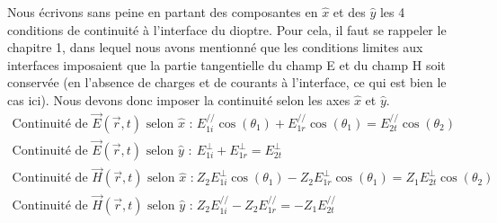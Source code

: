 Nous écrivons sans peine en partant des composantes en $\hat{x}$ et des $\hat{y}$ les 4 conditions de continuité à l'interface du dioptre. Pour cela, il faut se rappeler le chapitre 1, dans lequel nous avons mentionné que les conditions limites aux interfaces imposaient que la partie tangentielle du champ E et du champ H soit conservée (en l'absence de charges et de courants à l'interface, ce qui est bien le cas ici). Nous devons donc imposer la continuité selon les axes $\hat{x}$ et $\hat{y}$. %
\begin{equation*}
\begin{split}
\mbox{Continuité de $\vec{E}(\vec{r},t)$ selon $\hat{x}$ : }&\hspace{5pt} E^{//}_{1i} \cos(\theta_{1}) +E^{//}_{1r} \cos(\theta_{1}) = E^{//}_{2t} \cos(\theta_{2})\\
\mbox{Continuité de $\vec{E}(\vec{r},t)$ selon $\hat{y}$ : }&\hspace{5pt} E_{1i}^{\perp} + E_{1r}^{\perp} = E_{2t}^{\perp}  \\
\mbox{Continuité de $\vec{H}(\vec{r},t)$ selon $\hat{x}$ : }&\hspace{5pt} Z_2E^{\perp}_{1i}\cos(\theta_{1}) - Z_2E^{\perp}_{1r} \cos(\theta_{1}) = Z_1E^{\perp}_{2t} \cos(\theta_{2})   \\
\mbox{Continuité de $\vec{H}(\vec{r},t)$ selon $\hat{y}$ : }&\hspace{5pt} Z_2E^{//}_{1i} - Z_2E_{1r}^{//} = -Z_1E_{2t}^{//}
\end{split}
\end{equation*}
  
